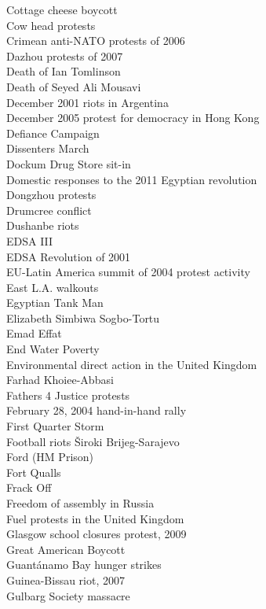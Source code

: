 Cottage cheese boycott\\
Cow head protests\\
Crimean anti-NATO protests of 2006\\
Dazhou protests of 2007\\
Death of Ian Tomlinson\\
Death of Seyed Ali Mousavi\\
December 2001 riots in Argentina\\
December 2005 protest for democracy in Hong Kong\\
Defiance Campaign\\
Dissenters March\\
Dockum Drug Store sit-in\\
Domestic responses to the 2011 Egyptian revolution\\
Dongzhou protests\\
Drumcree conflict\\
Dushanbe riots\\
EDSA III\\
EDSA Revolution of 2001\\
EU-Latin America summit of 2004 protest activity\\
East L.A. walkouts\\
Egyptian Tank Man\\
Elizabeth Simbiwa Sogbo-Tortu\\
Emad Effat\\
End Water Poverty\\
Environmental direct action in the United Kingdom\\
Farhad Khoiee-Abbasi\\
Fathers 4 Justice protests\\
February 28, 2004 hand-in-hand rally\\
First Quarter Storm\\
Football riots Široki Brijeg-Sarajevo\\
Ford (HM Prison)\\
Fort Qualls\\
Frack Off\\
Freedom of assembly in Russia\\
Fuel protests in the United Kingdom\\
Glasgow school closures protest, 2009\\
Great American Boycott\\
Guantánamo Bay hunger strikes\\
Guinea-Bissau riot, 2007\\
Gulbarg Society massacre\\
